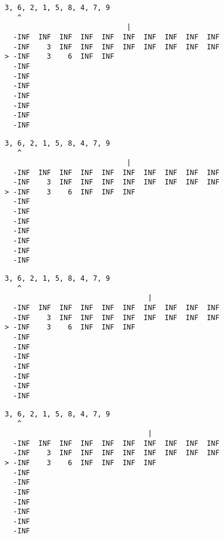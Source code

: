{ \begin{verbatim}
3, 6, 2, 1, 5, 8, 4, 7, 9
   ^
                             |
  -INF  INF  INF  INF  INF  INF  INF  INF  INF  INF
  -INF    3  INF  INF  INF  INF  INF  INF  INF  INF
> -INF    3    6  INF  INF                         
  -INF                                             
  -INF                                             
  -INF                                             
  -INF                                             
  -INF                                             
  -INF                                             
  -INF                                             
\end{verbatim} }

{ \begin{verbatim}
3, 6, 2, 1, 5, 8, 4, 7, 9
   ^
                             |
  -INF  INF  INF  INF  INF  INF  INF  INF  INF  INF
  -INF    3  INF  INF  INF  INF  INF  INF  INF  INF
> -INF    3    6  INF  INF  INF                    
  -INF                                             
  -INF                                             
  -INF                                             
  -INF                                             
  -INF                                             
  -INF                                             
  -INF                                             
\end{verbatim} }

{ \begin{verbatim}
3, 6, 2, 1, 5, 8, 4, 7, 9
   ^
                                  |
  -INF  INF  INF  INF  INF  INF  INF  INF  INF  INF
  -INF    3  INF  INF  INF  INF  INF  INF  INF  INF
> -INF    3    6  INF  INF  INF                    
  -INF                                             
  -INF                                             
  -INF                                             
  -INF                                             
  -INF                                             
  -INF                                             
  -INF                                             
\end{verbatim} }

{ \begin{verbatim}
3, 6, 2, 1, 5, 8, 4, 7, 9
   ^
                                  |
  -INF  INF  INF  INF  INF  INF  INF  INF  INF  INF
  -INF    3  INF  INF  INF  INF  INF  INF  INF  INF
> -INF    3    6  INF  INF  INF  INF               
  -INF                                             
  -INF                                             
  -INF                                             
  -INF                                             
  -INF                                             
  -INF                                             
  -INF                                             
\end{verbatim} }


